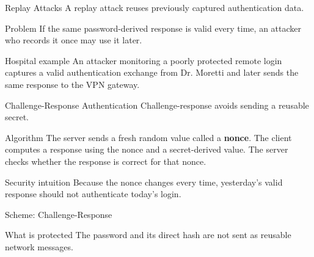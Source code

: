 \documentclass[presentation]{beamer}
\begin{document}
\begin{frame}[c]{Replay Attacks}
  A replay attack reuses previously captured authentication data.

  \begin{block}{Problem}
    If the same password-derived response is valid every time, an attacker who records it once may use it later.
  \end{block}

  \begin{exampleblock}{Hospital example}
    An attacker monitoring a poorly protected remote login captures a valid authentication exchange from Dr. Moretti and later sends the same response to the VPN gateway.
  \end{exampleblock}
\end{frame}

\begin{frame}[c]{Challenge-Response Authentication}
  Challenge-response avoids sending a reusable secret.

  \begin{block}{Algorithm}
    The server sends a fresh random value called a \textbf{nonce}. The client computes a response using the nonce and a secret-derived value. The server checks whether the response is correct for that nonce.
  \end{block}

  \begin{block}{Security intuition}
    Because the nonce changes every time, yesterday's valid response should not authenticate today's login.
  \end{block}
\end{frame}

\begin{frame}[c]{Scheme: Challenge-Response}
  \begin{center}
  \end{center}

  \vspace{0.45cm}
  \begin{block}{What is protected}
    The password and its direct hash are not sent as reusable network messages.
  \end{block}
\end{frame}
\end{document}
